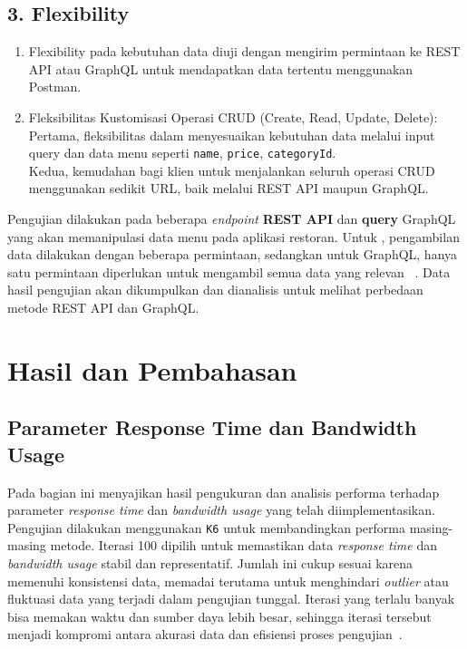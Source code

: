 \documentclass[
 manuscript=article,  %
  layout=publish, 
  year=2024, 
  month= Februari, %
  volume=8,
  number=1 
]{JIKO}
\begin{document}
\vspace{1em}
\subsection*{3. Flexibility}

\begin{enumerate}[label=\alph*., leftmargin=2em]
  \item Flexibility pada kebutuhan data diuji dengan mengirim permintaan ke REST API atau GraphQL untuk mendapatkan data tertentu menggunakan Postman.
  \item Fleksibilitas Kustomisasi Operasi CRUD (Create, Read, Update, Delete):\\
  Pertama, fleksibilitas dalam menyesuaikan kebutuhan data melalui input query dan data menu seperti \texttt{name}, \texttt{price}, \texttt{categoryId}.\\
  Kedua, kemudahan bagi klien untuk menjalankan seluruh operasi CRUD menggunakan sedikit URL, baik melalui REST API maupun GraphQL.
\end{enumerate}

Pengujian dilakukan pada beberapa \textit{endpoint} \textbf{REST API} dan \textbf{query} GraphQL yang akan memanipulasi data menu pada aplikasi restoran. Untuk , pengambilan data dilakukan dengan beberapa permintaan, sedangkan untuk GraphQL, hanya satu permintaan diperlukan untuk mengambil semua data yang relevan ~\cite{12}. Data hasil pengujian akan dikumpulkan dan dianalisis untuk melihat perbedaan metode REST API dan GraphQL. 

\section{Hasil dan Pembahasan}

\subsection{Parameter Response Time dan Bandwidth Usage}

Pada bagian ini menyajikan hasil pengukuran dan analisis performa terhadap parameter \textit{response time} dan \textit{bandwidth usage} yang telah diimplementasikan. Pengujian dilakukan menggunakan \texttt{K6} untuk membandingkan performa masing-masing metode. Iterasi 100 dipilih untuk memastikan data \textit{response time} dan \textit{bandwidth usage} stabil dan representatif. Jumlah ini cukup sesuai karena memenuhi konsistensi data, memadai terutama untuk menghindari \textit{outlier} atau fluktuasi data yang terjadi dalam pengujian tunggal. Iterasi yang terlalu banyak bisa memakan waktu dan sumber daya lebih besar, sehingga iterasi tersebut menjadi kompromi antara akurasi data dan efisiensi proses pengujian~\cite{13}. 
\end{document}
